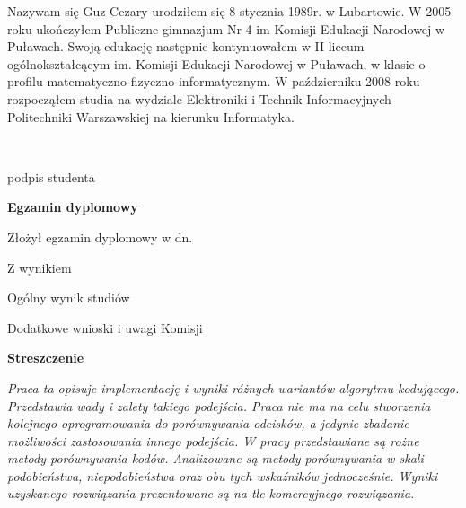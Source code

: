 \begin{titlepage}
    \indent
    Nazywam się  Guz Cezary urodziłem się 8 stycznia 1989r. w Lubartowie. W 2005 roku ukończyłem Publiczne gimnazjum Nr 4 im Komisji Edukacji Narodowej w Puławach. Swoją edukację następnie kontynuowałem w II liceum ogólnokształcącym im. Komisji Edukacji Narodowej w Puławach, w klasie o profilu matematyczno-fizyczno-informatycznym. W październiku 2008 roku rozpocząłem studia na wydziale Elektroniki i Technik Informacyjnych Politechniki Warszawskiej na kierunku Informatyka.
    \par
    \vspace{2\baselineskip}
    \hfill\parbox{15em}{{\small\dotfill}\\[-.3ex]
    \centerline{\footnotesize podpis studenta}}\par
    \vspace{3\baselineskip}
    \begin{center}
 	{\large\bfseries Egzamin dyplomowy} \par\bigskip\bigskip
    \end{center}
    \par\noindent\vspace{1.5\baselineskip}
    Złożył egzamin dyplomowy w dn. \dotfill
    \par\noindent\vspace{1.5\baselineskip}
    Z wynikiem \dotfill
    \par\noindent\vspace{1.5\baselineskip}
    Ogólny wynik studiów \dotfill
    \par\noindent\vspace{1.5\baselineskip}
    Dodatkowe wnioski i uwagi Komisji \dotfill
    \par\noindent\vspace{1.5\baselineskip}
    \dotfill

    \newpage\thispagestyle{empty}
    \vspace*{2\baselineskip}
    \begin{center}
	{\large\bfseries Streszczenie}\par\bigskip
    \end{center}

    {\itshape
    Praca ta opisuje implementację i wyniki różnych wariantów algorytmu kodującego. Przedstawia wady i zalety takiego podejścia. Praca nie ma na celu stworzenia kolejnego oprogramowania do porównywania odcisków, a jedynie zbadanie możliwości zastosowania innego podejścia. W pracy przedstawiane są rożne metody porównywania kodów. Analizowane są metody porównywania w skali podobieństwa, niepodobieństwa oraz obu tych wskaźników jednocześnie. Wyniki uzyskanego rozwiązania prezentowane są na tle komercyjnego rozwiązania.}
    \vspace*{1\baselineskip}


\end{titlepage}
